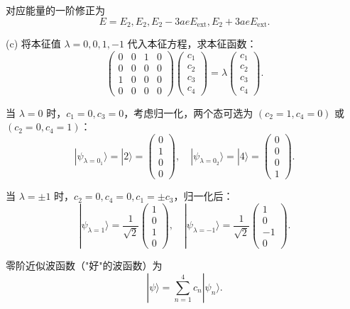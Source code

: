 对应能量的一阶修正为
\[
E = E_2, E_2, E_2 - 3ae E_{\mathrm{ext}}, E_2 + 3ae E_{\mathrm{ext}}.
\]

(c) 将本征值 $\lambda = 0, 0, 1, -1$ 代入本征方程，求本征函数：
\[
\begin{pmatrix}
	0 & 0 & 1 & 0 \\
	0 & 0 & 0 & 0 \\
	1 & 0 & 0 & 0 \\
	0 & 0 & 0 & 0
\end{pmatrix}
\begin{pmatrix}
	c_1 \\ c_2 \\ c_3 \\ c_4
\end{pmatrix}
= \lambda
\begin{pmatrix}
	c_1 \\ c_2 \\ c_3 \\ c_4
\end{pmatrix}.
\]

当 $\lambda = 0$ 时，$c_1 = 0, c_3 = 0$，考虑归一化，两个态可选为 $(c_2 = 1, c_4 = 0)$ 或 $(c_2 = 0, c_4 = 1)$：
\[
|\psi_{\lambda=0_1}\rangle = |2\rangle = \begin{pmatrix} 0 \\ 1 \\ 0 \\ 0 \end{pmatrix}, \quad
|\psi_{\lambda=0_2}\rangle = |4\rangle = \begin{pmatrix} 0 \\ 0 \\ 0 \\ 1 \end{pmatrix}.
\]

当 $\lambda = \pm 1$ 时，$c_2 = 0, c_4 = 0, c_1 = \pm c_3$，归一化后：
\[
|\psi_{\lambda=1}\rangle = \frac{1}{\sqrt{2}} \begin{pmatrix} 1 \\ 0 \\ 1 \\ 0 \end{pmatrix}, \quad
|\psi_{\lambda=-1}\rangle = \frac{1}{\sqrt{2}} \begin{pmatrix} 1 \\ 0 \\ -1 \\ 0 \end{pmatrix}.
\]

零阶近似波函数（"好"的波函数）为
\[
|\psi\rangle = \sum_{n=1}^4 c_n |\psi_{n}\rangle.
\]

